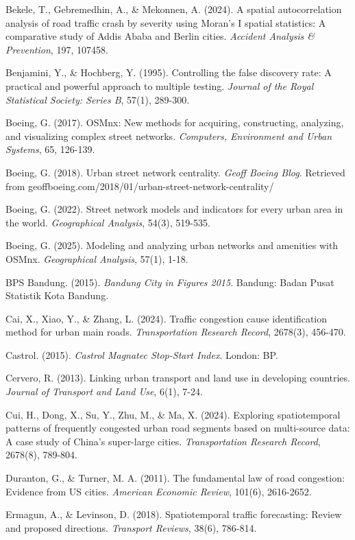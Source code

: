 \documentclass[12pt,a4paper]{article}
\begin{document}
Bekele, T., Gebremedhin, A., \& Mekonnen, A. (2024). A spatial autocorrelation analysis of road traffic crash by severity using Moran's I spatial statistics: A comparative study of Addis Ababa and Berlin cities. \emph{Accident Analysis \& Prevention}, 197, 107458.

Benjamini, Y., \& Hochberg, Y. (1995). Controlling the false discovery rate: A practical and powerful approach to multiple testing. \emph{Journal of the Royal Statistical Society: Series B}, 57(1), 289-300.

Boeing, G. (2017). OSMnx: New methods for acquiring, constructing, analyzing, and visualizing complex street networks. \emph{Computers, Environment and Urban Systems}, 65, 126-139.

Boeing, G. (2018). Urban street network centrality. \emph{Geoff Boeing Blog}. Retrieved from geoffboeing.com/2018/01/urban-street-network-centrality/

Boeing, G. (2022). Street network models and indicators for every urban area in the world. \emph{Geographical Analysis}, 54(3), 519-535.

Boeing, G. (2025). Modeling and analyzing urban networks and amenities with OSMnx. \emph{Geographical Analysis}, 57(1), 1-18.

BPS Bandung. (2015). \emph{Bandung City in Figures 2015}. Bandung: Badan Pusat Statistik Kota Bandung.

Cai, X., Xiao, Y., \& Zhang, L. (2024). Traffic congestion cause identification method for urban main roads. \emph{Transportation Research Record}, 2678(3), 456-470.

Castrol. (2015). \emph{Castrol Magnatec Stop-Start Index}. London: BP.

Cervero, R. (2013). Linking urban transport and land use in developing countries. \emph{Journal of Transport and Land Use}, 6(1), 7-24.

Cui, H., Dong, X., Su, Y., Zhu, M., \& Ma, X. (2024). Exploring spatiotemporal patterns of frequently congested urban road segments based on multi-source data: A case study of China's super-large cities. \emph{Transportation Research Record}, 2678(8), 789-804.

Duranton, G., \& Turner, M. A. (2011). The fundamental law of road congestion: Evidence from US cities. \emph{American Economic Review}, 101(6), 2616-2652.

Ermagun, A., \& Levinson, D. (2018). Spatiotemporal traffic forecasting: Review and proposed directions. \emph{Transport Reviews}, 38(6), 786-814.
\end{document}
